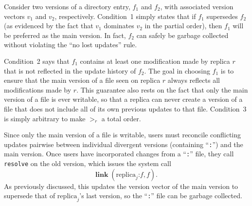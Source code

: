 Consider two versions of a directory entry, $f_1$ and $f_2$, with
associated version vectors $v_1$ and $v_2$, respectively.  Condition~1
simply states that if $f_1$ supersedes $f_2$ (as evidenced by the fact
that $v_1$ dominates $v_2$ in the partial order), then $f_1$ will be
preferred as the main version.  In fact, $f_2$ can safely be garbage
collected without violating the ``no lost updates'' rule.

Condition~2 says that $f_1$ contains at least one modification made by
replica $r$ that is not reflected in the update history of $f_2$.  The
goal in choosing $f_1$ is to ensure that the main version of a file
seen on replica $r$ always reflects all modifications made by $r$.
This guarantee also rests on the fact that only the main version of a
file is ever writable, so that a replica can never create a version of
a file that does not include all of its own previous updates to that
file.  Condition~3 is simply arbitrary to make $>_r$ a total order.

Since only the main version of a file is writable, users must
reconcile conflicting updates pairwise between individual divergent
versions (containing ``\texttt{:}'') and the main version.  Once users
have incorporated changes from a ``\texttt{:}'' file, they call
\texttt{resolve} on the old version, which issues the system call
$$\mathbf{link}\; (\mathrm{replica}_j\texttt{:}f, f).$$
As previously discussed, this updates the version vector of the main
version to supersede that of $\mathrm{replica}_j$'s last version, so
the ``\texttt{:}'' file can be garbage collected.


